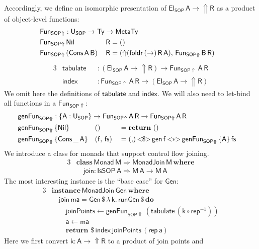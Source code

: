 \documentclass[acmsmall,screen]{acmart}
\newcommand{\mit}[1]{{\mathsf{#1}}}
\newcommand{\msf}[1]{{\mathsf{#1}}}
\newcommand{\mbf}[1]{{\mathbf{#1}}}
\newcommand{\mdo}{\mbf{do}\,}
\newcommand{\ind}{\hspace{1em}}
\newcommand{\return}{\mbf{return}\,}
\newcommand{\lam}{\lambda\,}
\newcommand{\where}{\mbf{where}}
\newcommand{\vma}{\mathsf{ma}}
\newcommand{\vk}{\mathsf{k}}
\newcommand{\vA}{\mathsf{A}}
\newcommand{\vB}{\mathsf{B}}
\newcommand{\vR}{\mathsf{R}}
\newcommand{\vM}{\mathsf{M}}
\newcommand{\va}{\mathsf{a}}
\newcommand{\vf}{\mathsf{f}}
\newcommand{\vfs}{\mathsf{fs}}
\newcommand{\SOP}{\msf{SOP}}
\newcommand{\El}{\msf{El}}
\newcommand{\USOP}{\msf{U}_{\msf{SOP}}}
\newcommand{\IsSOP}{\msf{IsSOP}}
\newcommand{\Nil}{\msf{Nil}}
\newcommand{\Cons}{\msf{Cons}}
\newcommand{\Monad}{\msf{Monad}}
\newcommand{\fro}{\leftarrow}
\newcommand{\Lift}{{\Uparrow}}
\newcommand{\MTy}{\msf{MetaTy}}
\newcommand{\Ty}{\msf{Ty}}
\theoremstyle{remark}
\newcommand{\tyclass}{\mbf{class}}
\newcommand{\instance}{\mbf{instance}\,}
\newcommand{\Gen}{\msf{Gen}}
\newcommand{\gen}{\mit{gen}}
\newcommand{\fmap}{<\!\!\$\!\!>}
\newcommand{\ap}{{<\!\!*\!\!>}}
\newcommand{\runGen}{\mit{runGen}}
\newcommand{\RA}{\Rightarrow}
\newcommand{\dlr}{\,\$\,}
\newcommand{\MonadJoin}{\msf{MonadJoin}}
\newcommand{\join}{\mit{join}}
\newcommand{\mindex}{\mit{index}}
\newcommand{\mtabulate}{\mit{tabulate}}
\begin{document}
Accordingly, we define an isomorphic presentation of $\El_\SOP\,\vA \to
\Lift \vR$ as a product of object-level functions:
\begin{alignat*}{3}
  &\mathrlap{\mit{Fun}_{\SOP\Lift} : \USOP \to \Ty \to \MTy}\\
  &\mit{Fun}_{\SOP\Lift}\,\Nil\,&& \vR = ()\\
  &\mit{Fun}_{\SOP\Lift}\,(\Cons\,\vA\,\vB)\,&& \vR = (\Lift(\mit{foldr}\,(\to)\,\vR\,\vA),\,\mit{Fun}_{\SOP\Lift}\,\vB\,\vR)
\end{alignat*}
\begin{alignat*}{3}
  &\mtabulate &&: (\El_\SOP\,\vA \to \Lift \vR) \to \mit{Fun}_{\SOP\Lift}\,\vA\,\vR\\
  &\mindex    &&: \mit{Fun}_{\SOP\Lift}\,\vA\,\vR \to (\El_\SOP\,\vA \to \Lift \vR)
\end{alignat*}
We omit here the definitions of $\mtabulate$ and $\mindex$. We will also need to
let-bind all functions in a $\mit{Fun}_{\SOP\Lift}$:
\begin{alignat*}{3}
  & \mathrlap{\mit{genFun}_{\SOP\Lift} : \{\vA : \USOP\} \to \mit{Fun}_{\SOP\Lift}\,\vA\,\vR \to \mit{Fun}_{\SOP\Lift}\,\vA\,\vR}\\
  & \mit{genFun}_{\SOP\Lift}\,\{\Nil\}        && ()             &&= \return\,()\\
  & \mit{genFun}_{\SOP\Lift}\,\{\Cons\,\_\,\vA\}&& (\vf,\,\mit{\vfs}) &&= ({,})\,{\fmap}\,\gen\,\vf\,{\ap}\,\mit{genFun}_{\SOP\Lift}\,\{\vA\}\,\vfs
\end{alignat*}
We introduce a class for monads that support control flow joining.
\begin{alignat*}{3}
  & \tyclass\,\Monad\,\vM \RA \MonadJoin\,\vM\,\where\\
  & \ind \join : \IsSOP\,\vA \RA \vM\,\vA \to \vM\,\vA
\end{alignat*}
The most interesting instance is the ``base case'' for $\Gen$:
\begin{alignat*}{3}
  &\instance \MonadJoin\,\Gen\,\where\\
  &\ind \join\,\vma = \Gen \dlr \lam \vk.\,\runGen \dlr \mdo\\
  &\ind \ind \mit{joinPoints} \fro \mit{genFun}_{\SOP\Lift}\,(\mtabulate\,(\vk \circ \mit{rep}^{-1}))\\
  &\ind \ind \va \fro \vma\\
  &\ind \ind \return \dlr \mindex\,\mit{joinPoints}\,(\mit{rep}\,\va)
\end{alignat*}
Here we first convert $\vk : \vA \to \Lift \vR$ to a product of join points and
\end{document}
